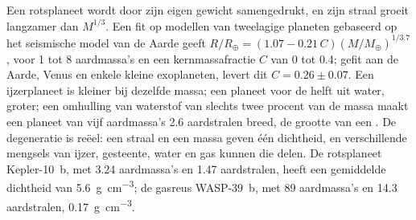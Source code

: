 Een rotsplaneet wordt door zijn eigen gewicht samengedrukt, en zijn straal groeit
langzamer dan $M^{1/3}$. Een fit op modellen van tweelagige planeten gebaseerd op
het seismische model van de Aarde geeft $R/R_\oplus = (1.07 - 0.21\,C)
(M/M_\oplus)^{1/3.7}$, voor 1 tot 8 aardmassa's en een kernmassafractie
$C$ van 0 tot 0.4; gefit aan de Aarde, Venus en enkele kleine
exoplaneten, levert dit $C = 0.26 \pm 0.07$. Een
ijzerplaneet is kleiner bij dezelfde massa; een planeet voor de helft uit water, groter;
een omhulling van waterstof van slechts twee procent van de massa maakt een planeet van
vijf aardmassa's \num{2.6} aardstralen breed, de grootte van een
. De degeneratie is reëel: een straal en een massa geven één
dichtheid, en verschillende mengsels van ijzer, gesteente, water en gas kunnen die delen.
De rotsplaneet Kepler-10~b, met 3.24 aardmassa's en 1.47 aardstralen,
heeft een gemiddelde dichtheid van \qty{5.6}{g.cm^{-3}}; de gasreus WASP-39~b,
met 89 aardmassa's en 14.3 aardstralen, \qty{0.17}{g.cm^{-3}}.

